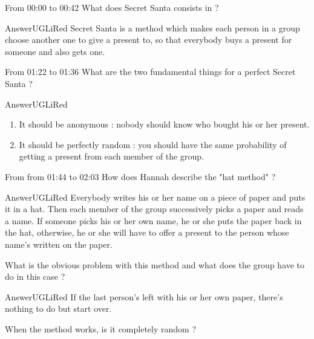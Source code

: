\documentclass[12pt,a4paper,article,english,firamath]{nsi}
\begin{document}
\maketitle

From 00:00 to 00:42 What does Secret Santa consists in ?
\begin{encadrecolore}{Answer}{UGLiRed}
Secret Santa is a method which makes each person in a group choose another one to give a present to, so that everybody buys a present for someone and also gets one.
\end{encadrecolore}
From 01:22 to 01:36 What are the two fundamental things for a perfect Secret Santa ?
\begin{encadrecolore}{Answer}{UGLiRed}
    \begin{enumerate}
        \item It should be anonymous : nobody should know who bought his or her present.
        \item It should be perfectly random : you should have the same probability of getting a present from each member of the group.
    \end{enumerate}
\end{encadrecolore}
From from 01:44 to 02:03 How does Hannah describe the "hat method" ?
\begin{encadrecolore}{Answer}{UGLiRed}
    Everybody writes his or her name on a piece of paper and puts it in a hat.
    Then each member of the group successively picks a paper and reads a name. If someone picks his or her own name, he or she puts the paper back in the hat, otherwise, he or she will have to offer a present to the person whose name's written on the paper. 
\end{encadrecolore}
What is the obvious problem with this method and what does the group have to do in this case ?
\begin{encadrecolore}{Answer}{UGLiRed}
    If the last person's left with his or her own paper, there's nothing to do but start over. 
\end{encadrecolore}
When the method works, is it completely random ?
\end{document}
